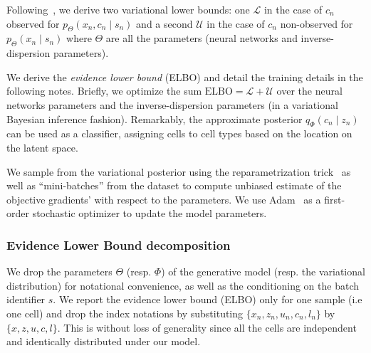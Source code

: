 Following~\cite{VFAE, m1m2}, we derive two variational lower bounds: one $\mathcal{L}$ in the case of $c_n$ observed for $p_\Theta(x_n, c_n \mid s_n)$ and a second $\mathcal{U}$ in the case of $c_n$ non-observed for $p_\Theta(x_n \mid s_n)$ where $\Theta$ are all the parameters (neural networks and inverse-dispersion parameters). 

We derive the \emph{evidence lower bound} (ELBO) and detail the training details in the following notes. Briefly, we optimize the sum $\text{ELBO} = \mathcal{L} + \mathcal{U}$ over the neural networks parameters and the inverse-dispersion parameters (in a variational Bayesian inference fashion). Remarkably, the approximate posterior $q_\Phi(c_n \mid z_n)$ can be used as a classifier, assigning cells to cell types based on the location on the latent space. 

We sample from the variational posterior using the reparametrization trick~\cite{aevb} as well as ``mini-batches'' from the dataset to compute unbiased estimate of the objective gradients' with respect to the parameters. We use Adam~\cite{adam} as a first-order stochastic optimizer to update the model parameters. 

\subsubsection{Evidence Lower Bound decomposition}
We drop the parameters $\Theta$ (resp. $\Phi$) of the generative model (resp. the variational distribution) for notational convenience, as well as the conditioning on the batch identifier $s$. We report the evidence lower bound (ELBO) only for one sample (i.e one cell) and drop the index notations by substituting $\{x_n, z_n, u_n, c_n, l_n\}$ by $\{x, z, u, c, l\}$. This is without loss of generality since all the cells are independent and identically distributed under our model.

